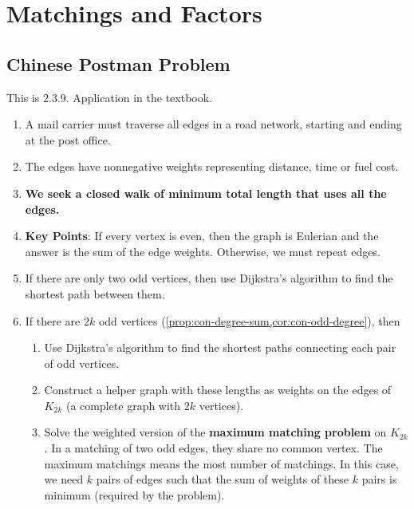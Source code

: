 \documentclass[../src/handouts/main.tex]{subfiles}
\begin{document}

\section{Matchings and Factors}

\subsection{Chinese Postman Problem}

This is 2.3.9. Application in the textbook.

\begin{enumerate}
  \item A mail carrier must traverse all edges in a road network, starting and ending at the post office.
  \item The edges have nonnegative weights representing distance, time or fuel cost.
  \item \textbf{We seek a closed walk of minimum total length that uses all the edges.}
  \item \textbf{Key Points}: If every vertex is even, then the graph is Eulerian and the answer is the sum of the edge weights. Otherwise, we must repeat edges.
  \item If there are only two odd vertices, then use Dijkstra's algorithm to find the shortest path between them.
  \item If there are $2 k$ odd vertices (\cref{prop:con-degree-sum,cor:con-odd-degree}), then
    \begin{enumerate}
      \item Use Dijkstra's algorithm to find the shortest paths connecting each pair of odd vertices.
      \item Construct a helper graph with these lengths as weights on the edges of $K_{2 k}$ (a complete graph with $2 k$ vertices).
      \item Solve the weighted version of the \textbf{maximum matching problem} on $K_{2 k}$. In a matching of two odd edges, they share no common vertex. The maximum matchings means the most number of matchings. In this case, we need $k$ pairs of edges such that the sum of weights of these $k$ pairs is minimum (required by the problem).
    \end{enumerate}
\end{enumerate}
\end{document}
